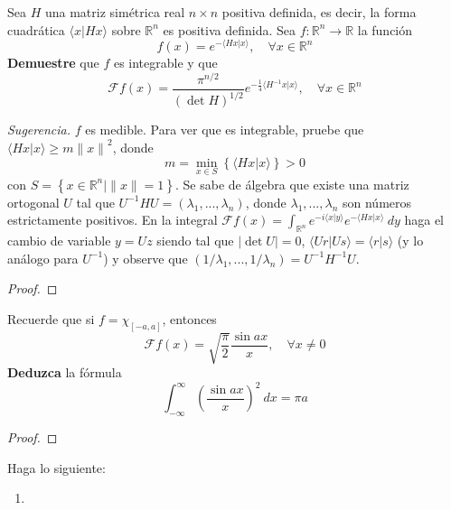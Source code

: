 \documentclass[12pt]{report}
\theoremstyle{largebreak}
\renewcommand{\geq}{\ensuremath{\geqslant}}
\newcommand\abs[1]{\ensuremath{\left|#1\right|}}
\newcommand\cf[3]{\ensuremath{#1:#2\rightarrow#3}}
\newcommand\norm[1]{\ensuremath{\|#1\|}}
\newcommand\pint[2]{\ensuremath{\langle#1| #2\rangle}}
\newcommand{\fou}[1]{\ensuremath{\mathcal{F}#1}}
\newcommand{\diag}[1]{\ensuremath{\left(#1\right)}}
\begin{document}
    \begin{excer}
        Sea $H$ una matriz simétrica real $n\times n$ positiva definida, es decir, la forma cuadrática $\pint{x}{Hx}$ sobre $\mathbb{R}^n$ es positiva definida. Sea $\cf{f}{\mathbb{R}^n}{\mathbb{R}}$ la función
        \begin{equation*}
            f(x)=e^{ -\pint{Hx}{x}},\quad\forall x\in\mathbb{R}^n
        \end{equation*}
        \textbf{Demuestre} que $f$ es integrable y que
        \begin{equation*}
            \fou{f}(x)=\frac{\pi^{ n/2}}{\left(\det H\right)^{ 1/2}}e^{ -\frac{1}{4}\pint{H^{-1}x}{x}},\quad\forall x\in\mathbb{R}^n
        \end{equation*}
        
        \textit{Sugerencia.} $f$ es medible. Para ver que es integrable, pruebe que $\pint{Hx}{x}\geq m\norm{x}^2$, donde
        \begin{equation*}
            m=\min_{ x\in S} \left\{\pint{Hx}{x} \right\}>0
        \end{equation*}
        con $S=\left\{x\in\mathbb{R}^n\Big|\norm{x}=1 \right\}$. Se sabe de álgebra que existe una matriz ortogonal $U$ tal que $U^{-1}HU=\diag{\lambda_1,...,\lambda_n}$, donde $\lambda_1,...,\lambda_n$ son números estrictamente positivos. En la integral $\fou{f}(x)=\int_{\mathbb{R}^n}e^{ -i\pint{x}{y}}e^{ -\pint{Hx}{x}}\:dy$ haga el cambio de variable $y=Uz$ siendo tal que $\abs{\det U}=0$, $\pint{Ur}{Us}=\pint{r}{s}$ (y lo análogo para $U^{-1}$) y observe que $\diag{1/\lambda_1,...,1/\lambda_n}=U^{-1}H^{-1}U$.
    \end{excer}

    \begin{proof}
        
    \end{proof}

    \begin{excer}
        Recuerde que si $f=\chi_{[-a,a]}$, entonces
        \begin{equation*}
            \fou{f}(x)=\sqrt{\frac{\pi}{2}}\frac{\sin ax}{x},\quad\forall x\neq0
        \end{equation*}
        \textbf{Deduzca} la fórmula
        \begin{equation*}
            \int_{ -\infty}^{\infty}\left(\frac{\sin ax}{x} \right)^2\:dx=\pi a
        \end{equation*}
    \end{excer}

    \begin{proof}
        
    \end{proof}

    \begin{excer}
        Haga lo siguiente:
        \begin{enumerate}
            \item 
        \end{enumerate}
    \end{excer}
\end{document}

